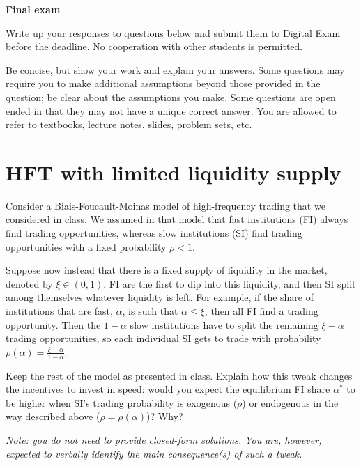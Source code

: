 \documentclass[a4paper]{article}
\newif\ifsolutions
\begin{document}
{\ifsolutions \else	
	
\fi}

\begin{center}
		\LARGE\textbf{Final exam {\ifsolutions solutions \fi}}
\end{center}

{\ifsolutions \else	
Write up your responses to questions below and submit them to Digital Exam before the deadline. No cooperation with other students is permitted.

Be concise, but show your work and explain your answers. Some questions may require you to make additional assumptions beyond those provided in the question; be clear about the assumptions you make. Some questions are open ended in that they may not have a unique correct answer. You are allowed to refer to textbooks, lecture notes, slides, problem sets, etc.
\fi}






\section{HFT with limited liquidity supply}

Consider a Biais-Foucault-Moinas model of high-frequency trading that we considered in class. We assumed in that model that fast institutions (FI) always find trading opportunities, whereas slow institutions (SI) find trading opportunities with a fixed probability $\rho < 1$.

Suppose now instead that there is a fixed supply of liquidity in the market, denoted by $\xi \in (0,1)$. FI are the first to dip into this liquidity, and then SI split among themselves whatever liquidity is left. For example, if the share of institutions that are fast, $\alpha$, is such that $\alpha \leq \xi$, then all FI find a trading opportunity. Then the $1-\alpha$ slow institutions have to split the remaining $\xi-\alpha$ trading opportunities, so each individual SI gets to trade with probability $\rho(\alpha) = \frac{\xi-\alpha}{1-\alpha}$.

Keep the rest of the model as presented in class. Explain how this tweak changes the incentives to invest in speed: would you expect the equilibrium FI share $\alpha^*$ to be higher when SI's trading probability is exogenous ($\rho$) or endogenous in the way described above ($\rho = \rho(\alpha)$)? Why?

\emph{Note: you do not need to provide closed-form solutions. You are, however, expected to verbally identify the main consequence(s) of such a tweak.}
\end{document}
